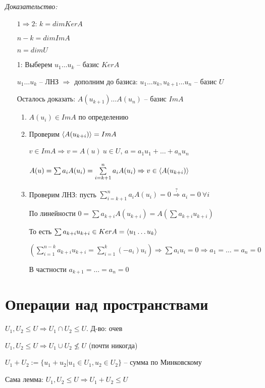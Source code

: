 \documentclass[12pt]{article}
\begin{document}
\textit{Доказательство:}

\begin{itemize}
    \item[$1 \Rightarrow 2$:] $k = dimKerA$
    
    $n - k = dimImA$

    $n = dimU$

    \item[1:] Выберем $u_1 \ldots u_k$ -- базис $KerA$
    
    $u_1 \ldots u_k$ -- ЛНЗ $\Rightarrow$ дополним до базиса: $u_1 \ldots u_k, u_{k + 1} \ldots u_n$ -- базис $U$

    Осталось доказать: $A(u_{k + 1}) \ldots A(u_n)$ -- базис $ImA$

    \begin{enumerate}
        \item $A(u_i) \in ImA$ по определению
        \item Проверим $\langle A(u_{k + i}) \rangle = ImA$
        
        $v \in ImA \Rightarrow v = A(u)\ u \in U$, $a = a_1u_1 + \ldots + a_nu_n$

        $A(u) = \sum a_iA(u_i) = \sum\limits_{i = k + 1}^n a_iA(u_i) \Rightarrow v \in \langle A(u_{k + i}) \rangle$

        \item Проверим ЛНЗ: пусть $\sum\limits_{i = k + 1}^n a_iA(u_i) = 0 \stackrel{?}{\Rightarrow} a_i = 0\ \forall i$
        
        По линейности $0 = \sum a_{k + i}A(u_{k + i}) = A(\sum a_{k + i}u_{k + i})$

        То есть $\sum a_{k + i}u_{k + i} \in KerA = \langle u_1 \ldots u_k \rangle$

        $(\sum\limits_{i = 1}^{n - k} a_{k + i}u_{k + i} = \sum\limits_{i = 1}^k (-a_i)u_i) \Rightarrow \sum a_iu_i = 0 \Rightarrow a_1 = \ldots = a_n = 0$

        В частности $a_{k + 1} = \ldots = a_n = 0$
    \end{enumerate}
\end{itemize}

\section{Операции над пространствами}

\begin{lem}{}
    $U_1, U_2 \leq U \Rightarrow U_1 \cap U_2 \leq U$. Д-во: очев

    $U_1, U_2 \leq U \Rightarrow U_1 \cup U_2 \not\leq U$ (почти никогда)

    $U_1 + U_2 := \{ u_1 + u_2 | u_1 \in U_1, u_2 \in U_2 \}$ -- сумма по Минковскому

    Сама лемма: $U_1, U_2 \leq U \Rightarrow U_1 + U_2 \leq U$
\end{lem}
\end{document}
